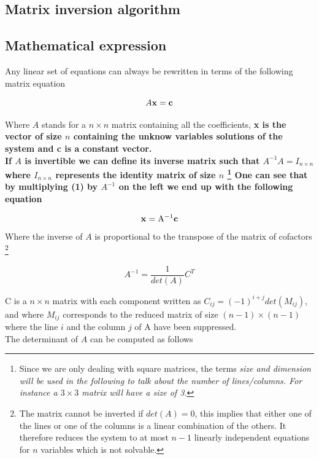 \documentclass[10 pt]{article}
\begin{document}
\begin{multicols}{2}

\section{Matrix inversion algorithm} 

\subsection{Mathematical expression} 

Any linear set of equations can always be rewritten in terms of the following matrix equation

\begin{equation}\label{eq:1}
A \bf x \rm= \bf c
\end{equation}

Where $A$ stands for a  $n \times n$  matrix containing all the coefficients, \bf x \rm is the vector of size $n$ containing the unknow variables solutions of the system and \bf c \rm  is a constant vector. 
\\If $A$ is invertible we can define its inverse matrix such that $A^{-1} A = I_{n\times n}$ where $I_{n\times n}$  represents the identity matrix of size $n$ \footnote{Since we are only dealing with square matrices, the terms \it size \rm and \it dimension \rm will be used in the following to talk about the number of lines/columns. For instance a $3\times 3$ matrix will have a size of 3.}
One can see that by multiplying (1) by $A^{-1}$ on the left we end up with the following equation

\begin{equation}
\bf x \rm = A^{-1}  \bf c
\end{equation}
Where the inverse of $A$ is proportional to the transpose of the matrix of cofactors
\footnote{The matrix cannot be inverted if $det(A) = 0$, this implies that either one of the lines or one of the columns is a linear combination of the others. It therefore reduces the system to at most $n-1$ linearly independent equations for $n$ variables which is not solvable.}

\begin{equation}
A^{-1} = \frac{1}{det(A)} C^{T}
\end{equation}

C is a $n \times n$ matrix with each component written as $C_{ij} = (-1)^{i+j} det(M_{ij})$, and where $M_{ij}$ corresponds to the reduced matrix of size $(n-1) \times (n-1)$ where the line $i$ and the column $j$ of A have been suppressed.
\\The determinant of $A$ can be computed as follows


\end{multicols}
\end{document}
